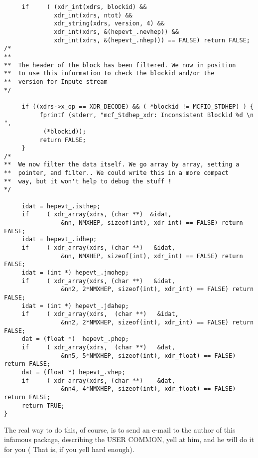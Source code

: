 \begin{verbatim}
     if     ( (xdr_int(xdrs, blockid) &&
     	      xdr_int(xdrs, ntot) &&
     	      xdr_string(xdrs, version, 4) &&
     	      xdr_int(xdrs, &(hepevt_.nevhep)) &&
              xdr_int(xdrs, &(hepevt_.nhep))) == FALSE) return FALSE;
/*
**
**	The header of the block has been filtered. We now in position
**	to use this information to check the blockid and/or the 
**	version for Inpute stream
*/
              
     if ((xdrs->x_op == XDR_DECODE) && ( *blockid != MCFIO_STDHEP) ) {
          fprintf (stderr, "mcf_Stdhep_xdr: Inconsistent Blockid %d \n ", 
           (*blockid));
          return FALSE;
     }
/*
**	We now filter the data itself. We go array by array, setting a 
**	pointer, and filter.. We could write this in a more compact
**	way, but it won't help to debug the stuff !
*/

     idat = hepevt_.isthep;
     if     ( xdr_array(xdrs, (char **)  &idat,
                &nn, NMXHEP, sizeof(int), xdr_int) == FALSE) return FALSE;
     idat = hepevt_.idhep;
     if     ( xdr_array(xdrs, (char **)   &idat,
                &nn, NMXHEP, sizeof(int), xdr_int) == FALSE) return FALSE;
     idat = (int *) hepevt_.jmohep;
     if     ( xdr_array(xdrs, (char **)   &idat,
                &nn2, 2*NMXHEP, sizeof(int), xdr_int) == FALSE) return FALSE;
     idat = (int *) hepevt_.jdahep;
     if     ( xdr_array(xdrs,  (char **)   &idat,
                &nn2, 2*NMXHEP, sizeof(int), xdr_int) == FALSE) return FALSE;
     dat = (float *)  hepevt_.phep;
     if     ( xdr_array(xdrs,  (char **)   &dat,
                &nn5, 5*NMXHEP, sizeof(int), xdr_float) == FALSE) return FALSE; 
     dat = (float *) hepevt_.vhep;
     if     ( xdr_array(xdrs, (char **)    &dat,
                &nn4, 4*NMXHEP, sizeof(int), xdr_float) == FALSE) return FALSE;
     return TRUE;
}   

\end{verbatim}

The real way to do this, of course, is to send an e-mail to the 
author of this infamous package, describing the USER COMMON, yell 
at him, and he will do it for you ( That is, if you yell hard enough). 




